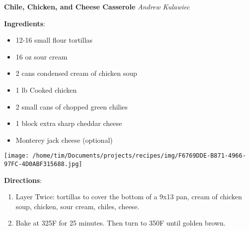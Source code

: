 \documentclass[11pt, twoside, openany]{book}
\begin{document}
\noindent\begin{minipage}[t]{\linewidth}%
{\Large\textbf{Chile, Chicken, and Cheese Casserole}} \label{chile,-chicken,-and-cheese-casserole}\hfill\textit{Andrew Kulawiec}\\
\noindent\begin{minipage}[t]{0.78\linewidth}%
\textbf{Ingredients}:\vspace{-3mm}
\begin{multicols}{2}
\begin{itemize}\setlength\itemsep{-1mm}
\item 12-16 small flour tortillas
\item 16 oz sour cream
\item 2 cans condensed cream of chicken soup
\item 1 lb Cooked chicken
\item 2 small cans of chopped green chilies
\item 1 block extra sharp cheddar cheese
\item Monterey jack cheese (optional)
\end{itemize}
\end{multicols}
\end{minipage}
\noindent\begin{minipage}[t]{0.18\linewidth}
\centering \strut\vspace*{-\baselineskip}\newline
\texttt{[image: /home/tim/Documents/projects/recipes/img/F6769DDE-B871-4966-97FC-4D0ABF315688.jpg]}\\
\end{minipage}\vspace{3mm}
\textbf{Directions}:
\vspace{-3mm}\begin{enumerate}\setlength\itemsep{-1mm}
\item Layer Twice: tortillas to cover the bottom of a 9x13 pan, cream of chicken soup, chicken, sour cream, chiles, cheese.
\item Bake at 325F for 25 minutes. Then turn to 350F until golden brown.
\end{enumerate}
\end{minipage}\vspace{8mm}
\end{document}
